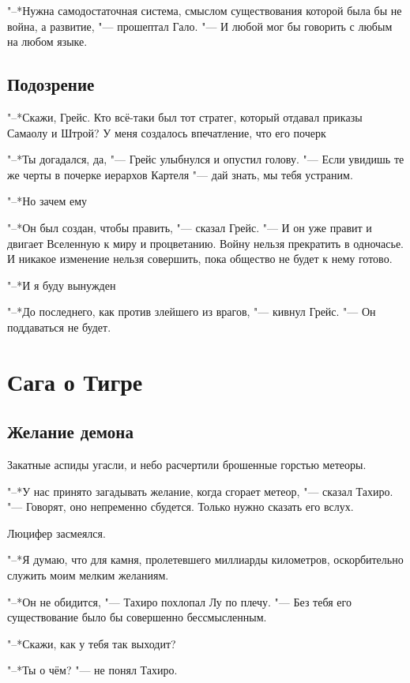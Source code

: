 \documentclass[a4paper,10pt]{book}
\newcommand{\ldotst}{\so{...}\xspace}
\newcommand{\ldotsq}{\so{?\hbox{\hspace{-.212em}}..}\xspace}
\begin{document}
"--*Нужна самодостаточная система, смыслом существования которой была бы не 
война, а развитие, "--- прошептал Гало. "--- И любой мог бы говорить с любым на 
любом языке.

\section{Подозрение}

"--*Скажи, Грейс. Кто всё-таки был тот стратег, который отдавал приказы Самаолу и Штрой? У меня создалось впечатление, что его почерк\ldotst

"--*Ты догадался, да, "--- Грейс улыбнулся и опустил голову. "--- Если увидишь те же черты в почерке иерархов Картеля "--- дай знать, мы тебя устраним.

"--*Но зачем ему\ldotsq

"--*Он был создан, чтобы править, "--- сказал Грейс. "--- И он уже правит и двигает Вселенную к миру и процветанию. Войну нельзя прекратить в одночасье. И никакое изменение нельзя совершить, пока общество не будет к нему готово.

"--*И я буду вынужден\ldotst

"--*До последнего, как против злейшего из врагов, "--- кивнул Грейс. "--- Он поддаваться не будет.

\chapter{Сага о Тигре}

\section{Желание демона}

Закатные аспиды угасли, и небо расчертили брошенные горстью метеоры. 

"--*У нас принято загадывать желание, когда сгорает метеор, "--- сказал Тахиро.
"--- Говорят, оно непременно сбудется.
Только нужно сказать его вслух.

Люцифер засмеялся.

"--*Я думаю, что для камня, пролетевшего миллиарды километров, оскорбительно служить моим мелким желаниям.

"--*Он не обидится, "--- Тахиро похлопал Лу по плечу.
"--- Без тебя его существование было бы совершенно бессмысленным.

"--*Скажи, как у тебя так выходит?

"--*Ты о чём? "--- не понял Тахиро.
\end{document}
